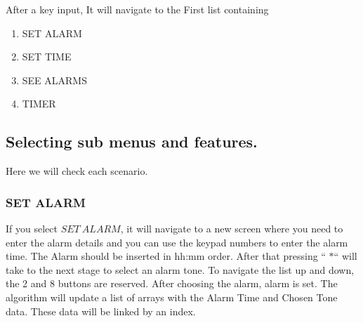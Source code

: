 After a key input, It will navigate to the First list containing
\begin{enumerate}
\item SET ALARM
\item SET TIME
\item SEE ALARMS
\item TIMER
\end{enumerate}
\subsection{Selecting sub menus and features.}
Here we will check each scenario.

\subsubsection{SET ALARM} 
If you select $SET \: ALARM$, it will navigate to a new screen where you need to enter the alarm details and you can use the keypad numbers to enter the alarm time. The Alarm should be inserted in hh:mm order. After that pressing “ $* $“  will take to the next stage to select an alarm tone. To navigate the list up and down, the 2 and 8 buttons are reserved. After choosing the alarm, alarm is set. The algorithm will update a list of arrays with the Alarm Time and Chosen Tone data. These data will be linked by an index.

\begin{minipage}{0.97\textwidth}
 \noindent{}\hfill
\noindent{}\hfill
{}
\end{minipage}



